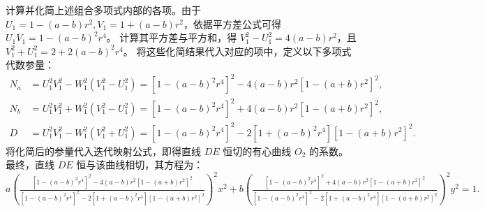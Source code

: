 \begin{solution}
计算并化简上述组合多项式内部的各项。由于 $U_1 = 1 - (a-b)r^2, V_1 = 1 + (a-b)r^2$，依据平方差公式可得 $U_1 V_1 = 1 - (a-b)^2 r^4$。
计算其平方差与平方和，得 $V_1^2 - U_1^2 = 4(a-b)r^2$，且 $V_1^2 + U_1^2 = 2 + 2(a-b)^2 r^4$。
将这些化简结果代入对应的项中，定义以下多项式代数参量：
\begin{align*}
    N_a &= U_1^2 V_1^2 - W_1^2(V_1^2 - U_1^2) = \left[1 - (a-b)^2 r^4\right]^2 - 4(a-b)r^2 \left[1 - (a+b)r^2\right]^2, \\
    N_b &= U_1^2 V_1^2 + W_1^2(V_1^2 - U_1^2) = \left[1 - (a-b)^2 r^4\right]^2 + 4(a-b)r^2 \left[1 - (a+b)r^2\right]^2, \\
    D &= U_1^2 V_1^2 - W_1^2(V_1^2 + U_1^2) = \left[1 - (a-b)^2 r^4\right]^2 - 2\left[1 + (a-b)^2 r^4\right]\left[1 - (a+b)r^2\right]^2.
\end{align*}
将化简后的参量代入迭代映射公式，即得直线 $DE$ 恒切的有心曲线 $O_2$ 的系数。最终，直线 $DE$ 恒与该曲线相切，其方程为：
\[ a \left( \tfrac{\left[1 - (a-b)^2 r^4\right]^2 - 4(a-b)r^2 \left[1 - (a+b)r^2\right]^2}{\left[1 - (a-b)^2 r^4\right]^2 - 2\left[1 + (a-b)^2 r^4\right]\left[1 - (a+b)r^2\right]^2} \right)^2 x^2 + b \left( \tfrac{\left[1 - (a-b)^2 r^4\right]^2 + 4(a-b)r^2 \left[1 - (a+b)r^2\right]^2}{\left[1 - (a-b)^2 r^4\right]^2 - 2\left[1 + (a-b)^2 r^4\right]\left[1 - (a+b)r^2\right]^2} \right)^2 y^2 = 1. \]
\end{solution}



